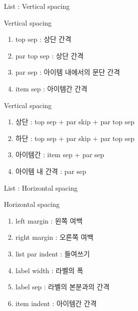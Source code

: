 \documentclass[ aspectratio=149,  10pt,blue,xcolor=pdftex,dvipsnames,table,handout,notes]{beamer}
\begin{document}
		\begin{frame}[c]{List : Vertical spacing}

			\begin{block} {Vertical spacing}
			\begin{enumerate}
			\item	top sep		: 상단 간격
			\item	par top sep	: 상단 간격
			\item	par sep		: 아이템 내에서의 문단 간격
			\item	item sep		: 아이템간 간격
			\end{enumerate}
			\end{block}

			\begin{block} {Vertical spacing}
			\begin{enumerate}
			\item	상단		: top sep + par skip + par top sep
			\item	하단		: top sep + par skip + par top sep
			\item	아이템간	: item sep + par sep
 			\item	아이템 내 간격	: par sep
			\end{enumerate}
			\end{block}

		\note[item]{}
		\end{frame}



		\begin{frame}[c]{List : Horizontal spacing}

			\begin{block} {Horizontal spacing}
			\begin{enumerate}
			\item	left margin		: 왼쪽 여백
			\item	right margin		: 오른쪽 여백
			\item	list par indent	: 들여쓰기
			\item	label width		: 라벨의 폭
			\item	label sep			: 라벨의 본분과의 간격
			\item	item indent		: 아이템간 간격
			\end{enumerate}
			\end{block}

		\note[item]{}
		\end{frame}
\end{document}
